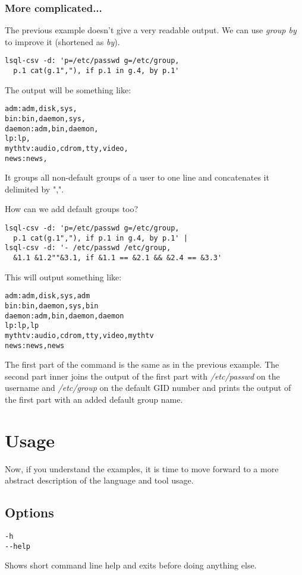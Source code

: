 \subsubsection{More complicated...}
The previous example doesn't give a very readable output. We can use \textit{group by} to improve it (shortened as \textit{by}).
\begin{verbatim}
lsql-csv -d: 'p=/etc/passwd g=/etc/group, 
  p.1 cat(g.1","), if p.1 in g.4, by p.1'
\end{verbatim}
The output will be something like:
\begin{verbatim}
adm:adm,disk,sys,
bin:bin,daemon,sys,
daemon:adm,bin,daemon,
lp:lp,
mythtv:audio,cdrom,tty,video,
news:news,
\end{verbatim}
It groups all non-default groups of a user to one line and concatenates it delimited by ",".

How can we add default groups too?
\begin{verbatim}
lsql-csv -d: 'p=/etc/passwd g=/etc/group, 
  p.1 cat(g.1","), if p.1 in g.4, by p.1' |
lsql-csv -d: '- /etc/passwd /etc/group, 
  &1.1 &1.2""&3.1, if &1.1 == &2.1 && &2.4 == &3.3'
\end{verbatim}
This will output something like:
\begin{verbatim}
adm:adm,disk,sys,adm
bin:bin,daemon,sys,bin
daemon:adm,bin,daemon,daemon
lp:lp,lp
mythtv:audio,cdrom,tty,video,mythtv
news:news,news
\end{verbatim}

The first part of the command is the same as in the previous example. The second part inner joins the output
of the first part with \textit{/etc/passwd} on the username and \textit{/etc/group} on the default GID number and prints
the output of the first part with an added default group name.



\section{Usage}
Now, if you understand the examples, it is time to move forward to a more abstract description of the language and tool usage.

\subsection{Options}
\begin{verbatim}
-h
--help
\end{verbatim}
Shows short command line help and exits before doing anything else.

